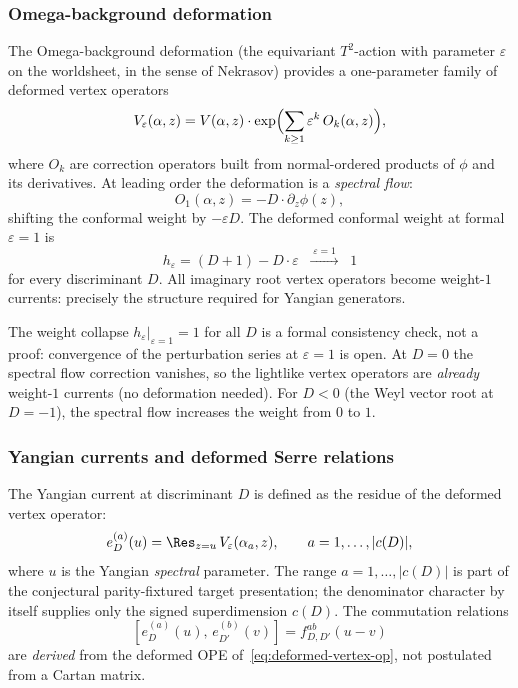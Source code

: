 \subsubsection{Omega-background deformation}
\label{subsubsec:k3e-omega-deformation}

\begin{conjecture}
\label{conj:vertex-op-yangian}
The Omega-background deformation (the equivariant $T^2$-action with parameter $\varepsilon$ on the worldsheet, in the sense of Nekrasov) provides a one-parameter family of deformed vertex operators
\begin{equation}
\label{eq:deformed-vertex-op}
V_\varepsilon(\alpha, z) = V(\alpha, z) \cdot \exp\Bigl(\sum_{k \geq 1} \varepsilon^k\, O_k(\alpha, z)\Bigr),
\end{equation}
where $O_k$ are correction operators built from normal-ordered products of $\phi$ and its derivatives. At leading order the deformation is a \emph{spectral flow}:
\[
O_1(\alpha, z) = -D \cdot \partial_z \phi(z),
\]
shifting the conformal weight by $-\varepsilon D$. The deformed conformal weight at formal $\varepsilon = 1$ is
\[
h_\varepsilon = (D + 1) - D \cdot \varepsilon \;\;\xrightarrow{\;\varepsilon = 1\;}\;\; 1
\]
for every discriminant $D$. All imaginary root vertex operators become weight-$1$ currents: precisely the structure required for Yangian generators.
\end{conjecture}

The weight collapse $h_\varepsilon|_{\varepsilon=1} = 1$ for all $D$ is a formal consistency check, not a proof: convergence of the perturbation series at $\varepsilon = 1$ is open. At $D = 0$ the spectral flow correction vanishes, so the lightlike vertex operators are \emph{already} weight-$1$ currents (no deformation needed). For $D < 0$ (the Weyl vector root at $D = -1$), the spectral flow increases the weight from $0$ to $1$.

\subsubsection{Yangian currents and deformed Serre relations}
\label{subsubsec:k3e-yangian-currents-serre}

The Yangian current at discriminant $D$ is defined as the residue of the deformed vertex operator:
\begin{equation}
\label{eq:yangian-current-def}
e_D^{(a)}(u) = \Res_{z = u}\, V_\varepsilon(\alpha_a, z), \qquad a = 1, \ldots, |c(D)|,
\end{equation}
where $u$ is the Yangian \emph{spectral} parameter. The range
\(a=1,\ldots,|c(D)|\) is part of the conjectural parity-fixtured target
presentation; the denominator character by itself supplies only the
signed superdimension \(c(D)\). The commutation relations
\[
[e_D^{(a)}(u),\, e_{D'}^{(b)}(v)] = f_{D,D'}^{ab}(u - v)
\]
are \emph{derived} from the deformed OPE of~\eqref{eq:deformed-vertex-op}, not postulated from a Cartan matrix.

